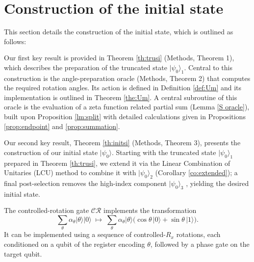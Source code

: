 \documentclass[aps,pra,twocolumn,superscriptaddress,preprintnumbers,amsmath,amssymb]{revtex4-2}
\begin{document}
\section{Construction of the initial state}
This section details the construction of the initial state, which is outlined as follows:\par
Our first key result is provided in  Theorem \ref{th:trusi} (Methods, Theorem 1), which describes the preparation  of the truncated state $|\psi_0\rangle_1$. Central to this construction is the angle-preparation oracle (Methods, Theorem 2) that computes the required rotation angles. Its action is defined in Definition \ref{def:Um} and its implementation  is outlined in Theorem \ref{the:Um}. A central subroutine of this oracle is the evaluation of a zeta function related partial sum (Lemma \ref{S oracle}), built upon Proposition \ref{lm:split} with detailed calculations given in Propositions \ref{prop:endpoint} and \ref{prop:summation}.\par
Our second key result, Theorem \ref{th:initsi} (Methods, Theorem 3),  presents the construction of our initial state $|\psi_0\rangle$. Starting with the truncated state $|\psi_0\rangle_1$ prepared in Theorem \ref{th:trusi}, we extend it via the Linear Combination of Unitaries (LCU) method to combine it with $|\psi_0\rangle_2$ (Corollary \ref{co:extended}); a final post-selection removes the high-index component $|\psi_0\rangle_3$ , yielding the desired initial state.
\begin{definition}
    The controlled-rotation gate $\mathcal{CR}$ implements the transformation
    \begin{equation}
\sum_{\theta}\alpha_{\theta}|\theta\rangle|0\rangle \;\mapsto\; \sum_{\theta}\alpha_{\theta}|\theta\rangle\bigl(\cos\theta\,|0\rangle + \sin\theta\,|1\rangle\bigr).
    \end{equation}
It can be implemented using a sequence of controlled-\(R_x\) rotations, each conditioned on a qubit of the register encoding \(\theta\), followed by a phase gate on the target qubit.
\end{definition}
\end{document}
